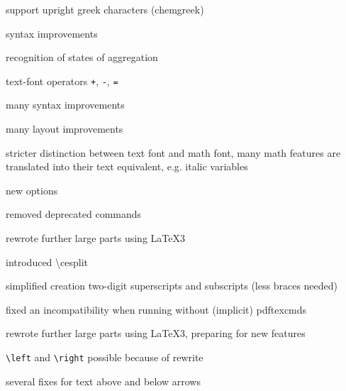 \documentclass[a4paper,notitlepage,parskip=half]{scrreprt}
\newcommand\macro[1]{{\ttfamily\textbackslash#1}}
\begin{document}
\begin{compactitem}
\item support upright greek characters (chemgreek)
\item syntax improvements%
\item recognition of states of aggregation%
\item text-font operators \verb|+|, \verb|-|, \verb|=|
\end{compactitem}

\begin{compactitem}
\item many syntax improvements
\item many layout improvements
\item stricter distinction between text font and math font, many math features are translated into their text equivalent, e.g. italic variables
\item new options
\item removed deprecated commands
\end{compactitem}

\begin{compactitem}
\item rewrote further large parts using \LaTeX3
\item introduced \macro{cesplit}
\item simplified creation two-digit superscripts and subscripts (less braces needed)
\end{compactitem}


\begin{compactitem}
\item fixed an incompatibility when running without (implicit) pdftexcmds
\end{compactitem}

\begin{compactitem}
\item rewrote further large parts using \LaTeX3, preparing for new features
\item \verb|\left| and \verb|\right| possible because of rewrite
\item several fixes for text above and below arrows
\end{compactitem}
\end{document}
